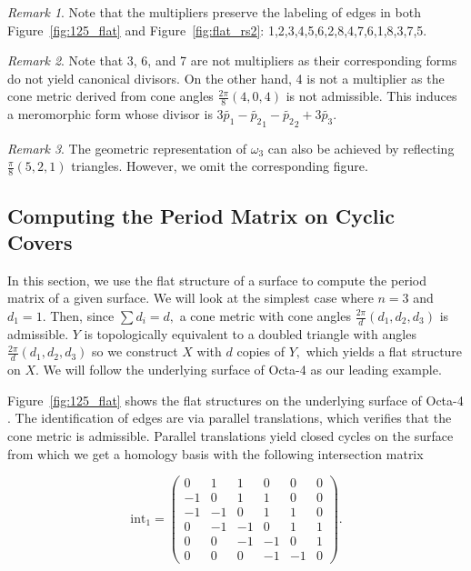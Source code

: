 \documentclass[12pt,reqno]{amsart}
\theoremstyle{definition}
\theoremstyle{remark}
\newtheorem*{remark}{Remark}
\begin{document}
\begin{remark} Note that the multipliers preserve the labeling of edges in both Figure~\ref{fig:125_flat} and Figure~\ref{fig:flat_rs2}: 1,2,3,4,5,6,2,8,4,7,6,1,8,3,7,5.
\end{remark}

\begin{remark} Note that 3, 6, and 7 are not multipliers as their corresponding forms do not yield canonical divisors. On the other hand, 4 is not a multiplier as the cone metric derived from cone angles $\frac{2 \pi}{8} (4, 0, 4)$ is not admissible. This induces a meromorphic form whose divisor is $3 \widetilde{p_1} - \widetilde{p_2}_1 - \widetilde{p_2}_2 + 3 \widetilde{p_3}.$ \end{remark}

\begin{remark} The geometric representation of $\omega_3$ can also be achieved by reflecting $\frac{\pi}{8}(5, 2, 1)$ triangles. However, we omit the corresponding figure. \end{remark}



\subsection{Computing the Period Matrix on Cyclic Covers}
\label{sec:cyclicperiod}
In this section, we use the flat structure of a surface to compute the period matrix of a given surface. We will look at the simplest case where $n = 3$ and $d_1 = 1.$ Then, since $\sum d_i = d,$ a cone metric with cone angles $\frac{2 \pi}{d}(d_1, d_2, d_3)$ is admissible. $Y$ is topologically equivalent to a doubled triangle with angles $\frac{2 \pi}{d}(d_1, d_2, d_3)$ so we construct $X$ with $d$ copies of $Y,$ which yields a flat structure on $X.$  We will follow the underlying surface of Octa-4 as our leading example.


Figure~\ref{fig:125_flat} shows the flat structures on the underlying surface of Octa-4 \cite{dami}. The identification of edges are via parallel translations, which verifies that the cone metric is admissible. Parallel translations yield closed cycles on the surface from which we get a homology basis with the following intersection matrix

$$\textrm{int}_1 = \begin{pmatrix} 0 & 1 & 1 & 0 & 0 & 0 \\
 -1 & 0 & 1 & 1 & 0 & 0 \\
 -1 & -1 & 0 & 1 & 1 & 0 \\
 0 & -1 & -1 & 0 & 1 & 1 \\
 0 & 0 & -1 & -1 & 0 & 1 \\
 0 & 0 & 0 & -1 & -1 & 0 \end{pmatrix}.$$
\end{document}

